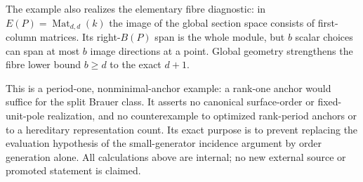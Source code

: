 The example also realizes the elementary fibre diagnostic: in
$E(P)=\operatorname{Mat}_{d,d}(k)$ the image of the global section
space consists of first-column matrices.  Its right-$B(P)$ span is
the whole module, but $b$ scalar choices can span at most $b$ image
directions at a point.  Global geometry strengthens the fibre lower
bound $b\ge d$ to the exact $d+1$.

This is a period-one, nonminimal-anchor example: a rank-one anchor
would suffice for the split Brauer class.  It asserts no canonical
surface-order or fixed-unit-pole realization, and no counterexample
to optimized rank-period anchors or to a hereditary representation
count.  Its exact purpose is to prevent replacing the evaluation
hypothesis of the small-generator incidence argument by order
generation alone.  All calculations above are internal; no new
external source or promoted statement is claimed.
